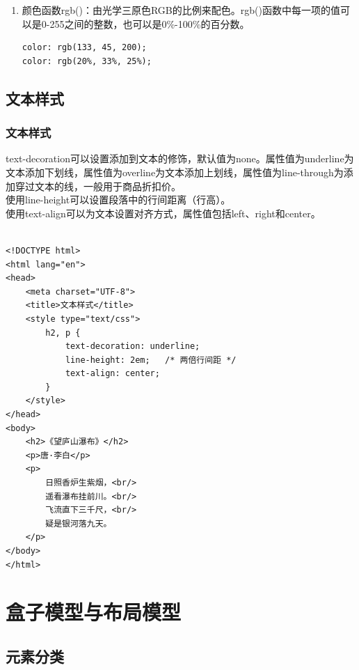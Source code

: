 \begin{enumerate}
    \item 颜色函数rgb()：由光学三原色RGB的比例来配色。rgb()函数中每一项的值可以是0-255之间的整数，也可以是0\%-100\%的百分数。 \\
          \begin{lstlisting}[style=htmlcssjs]
color: rgb(133, 45, 200);
color: rgb(20%, 33%, 25%);
    \end{lstlisting}
\end{enumerate}

\newpage

\section{文本样式}

\subsection{文本样式}

text-decoration可以设置添加到文本的修饰，默认值为none。属性值为underline为文本添加下划线，属性值为overline为文本添加上划线，属性值为line-through为添加穿过文本的线，一般用于商品折扣价。 \\

使用line-height可以设置段落中的行间距离（行高）。 \\

使用text-align可以为文本设置对齐方式，属性值包括left、right和center。 \\

 \\
\begin{lstlisting}[style=htmlcssjs]
<!DOCTYPE html>
<html lang="en">
<head>
    <meta charset="UTF-8">
    <title>文本样式</title>
    <style type="text/css">
        h2, p {
            text-decoration: underline;
            line-height: 2em;   /* 两倍行间距 */
            text-align: center;
        }
    </style>
</head>
<body>
    <h2>《望庐山瀑布》</h2>
    <p>唐·李白</p>
    <p>
        日照香炉生紫烟，<br/>
        遥看瀑布挂前川。<br/>
        飞流直下三千尺，<br/>
        疑是银河落九天。
    </p>
</body>
</html>
\end{lstlisting}

\newpage

\chapter{盒子模型与布局模型}

\section{元素分类}

